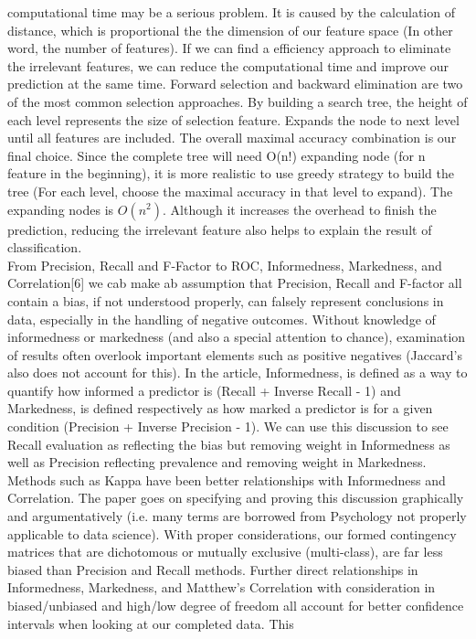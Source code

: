 \documentclass[acmtog, authorversion]{acmart}
\begin{document}
computational time may be a serious problem. It is caused by the calculation of distance, which is proportional the the dimension of our feature space 
(In other word, the number of features). If we can find a efficiency approach to eliminate the irrelevant features, we can reduce the computational time 
and improve our prediction at the same time. 
Forward selection and backward elimination are two of the most common selection approaches. By building a search tree, the height of each level represents 
the size of selection feature. Expands the node to next level until all features are included. The overall maximal accuracy combination is our final 
choice. Since the complete tree will need O(n!) expanding node (for n feature in the beginning), it is more realistic to use greedy strategy to build the 
tree (For each level, choose the maximal accuracy in that level to expand). The expanding nodes is $O(n^2)$. Although it increases the overhead to finish 
the prediction, reducing the irrelevant feature also helps to explain the result of classification.\\ 
From Precision, Recall and F-Factor to ROC, Informedness, Markedness, and Correlation[6] we cab make ab assumption that Precision, 
Recall and F-factor all contain a bias, if not understood properly, can falsely represent conclusions in data, especially in the handling of negative 
outcomes. Without knowledge of informedness or markedness (and also a special attention to chance), examination of results often overlook important 
elements such as positive negatives (Jaccard’s also does not account for this). In the article, Informedness, is defined as a way to quantify how 
informed a predictor is (Recall + Inverse Recall - 1) and Markedness, is defined respectively as how marked a predictor is for a given condition 
(Precision + Inverse Precision - 1). We can use this discussion to see Recall evaluation as reflecting the bias but removing weight in Informedness as 
well as Precision reflecting prevalence and removing weight in Markedness. Methods such as Kappa have been better relationships with Informedness and 
Correlation. The paper goes on specifying and proving this discussion graphically and argumentatively (i.e. many terms are borrowed from Psychology not 
properly applicable to data science). With proper considerations, our formed contingency matrices that are dichotomous or mutually exclusive 
(multi-class), are far less biased than Precision and Recall methods. Further direct relationships in Informedness, Markedness, and Matthew’s Correlation 
with consideration in biased/unbiased and high/low degree of freedom all account for better confidence intervals when looking at our completed data. This 
\end{document}
